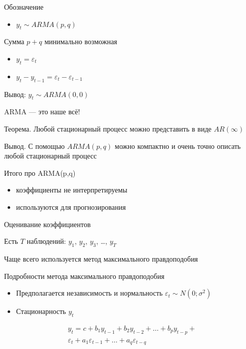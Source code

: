 \documentclass[ignorenonframetext,]{beamer}
\begin{document}
\begin{frame}{Обозначение}

\begin{itemize}
\itemsep1pt\parskip0pt
\item
  $y_t \sim ARMA(p,q)$
\end{itemize}

\end{frame}

\begin{frame}{Сумма $p+q$ минимально возможная}

\begin{itemize}
\item
  $y_t=\varepsilon_t$
\item
  $y_t-y_{t-1}=\varepsilon_t-\varepsilon_{t-1}$
\end{itemize}

Вывод: $y_t \sim ARMA(0,0)$

\end{frame}

\begin{frame}{ARMA --- это наше всё!}

Теорема. Любой стационарный процесс можно представить в виде
$AR(\infty)$

Вывод. С помощью $ARMA(p,q)$ можно компактно и очень точно описать любой
стационарный процесс

\end{frame}

\begin{frame}{Итого про ARMA(p,q)}

\begin{itemize}
\item
  коэффициенты не интерпретируемы
\item
  используются для прогнозирования
\end{itemize}

\end{frame}

\begin{frame}{Оценивание коэффициентов}

Есть $T$ наблюдений: $y_1$, $y_2$, $y_3$, \ldots, $y_T$

Чаще всего используется метод максимального правдоподобия

\end{frame}

\begin{frame}{Подробности метода максимального правдоподобия}

\begin{itemize}
\item
  Предполагается независимость и нормальность
  $\varepsilon_t \sim N(0;\sigma^2)$
\item
  Стационарность $y_t$
\end{itemize}

\begin{multline}
\nonumber
y_t=c + b_1 y_{t-1} + b_2 y_{t-2} + \ldots + b_p y_{t-p} + \\
\varepsilon_t + a_1 \varepsilon_{t-1} + \ldots + a_q \varepsilon_{t-q}
\end{multline}

\end{frame}
\end{document}
